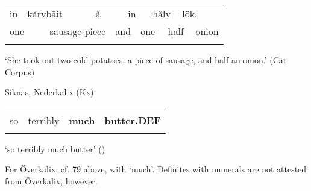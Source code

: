 \begin{tabular}{llllllllllll}
\lsptoprule
in & \multicolumn{2}{l}{kårvbäit

} & \multicolumn{2}{l}{å

} & \multicolumn{2}{l}{in

} & \multicolumn{2}{l}{hålv

} & \multicolumn{2}{l}{lök.

} & \\
\multicolumn{2}{l}{one

} & \multicolumn{2}{l}{sausage-piece

} & \multicolumn{2}{l}{and

} & \multicolumn{2}{l}{one

} & \multicolumn{2}{l}{half

} & \multicolumn{2}{l}{onion

}\\
\lspbottomrule
\end{tabular}

\begin{styleTranslation}
‘She took out two cold potatoes, a piece of sausage, and half an onion.’ (Cat Corpus)

\end{styleTranslation}


\begin{listWWNumileveli}
\item 

\begin{styleExample}
Siknäs, Nederkalix (Kx)

\end{styleExample}

\end{listWWNumileveli}

\begin{tabular}{llll}
\lsptoprule
\multicolumn{4}{l}{så

}\\
so & terribly & {\bfseries much} & {\bfseries butter.DEF}\\
\lspbottomrule
\end{tabular}

\begin{styleTranslation}
‘so terribly much butter’ (\citet{Stenberg1971})

\end{styleTranslation}

\begin{styleBodyTextFirst}
For Överkalix, cf. 79 above, with ‘much’. Definites with numerals are not attested from Överkalix, however.

\end{styleBodyTextFirst}

